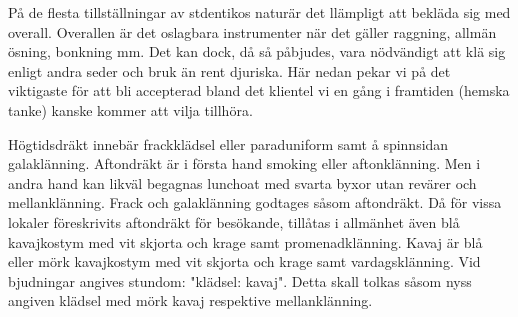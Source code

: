 
\pagestyle{Att Bonka med Shtil}


    På de flesta tillställningar av stdentikos naturär det llämpligt att bekläda sig med overall. Overallen är det oslagbara instrumenter när det gäller raggning, allmän ösning, bonkning  mm. Det kan dock, då så påbjudes, vara nödvändigt att klä sig enligt andra seder och bruk än rent djuriska. Här nedan pekar vi på det viktigaste för att bli accepterad bland det klientel vi en gång i framtiden (hemska tanke) kanske kommer att vilja tillhöra.

    Högtidsdräkt innebär frackklädsel eller paraduniform samt å spinnsidan galaklänning. Aftondräkt är i första hand smoking eller aftonklänning. Men i andra hand kan likväl begagnas lunchoat med svarta byxor utan revärer och mellanklänning. Frack och galaklänning godtages såsom aftondräkt. Då för vissa lokaler föreskrivits aftondräkt för besökande, tillåtas i allmänhet även blå kavajkostym med vit skjorta och krage samt promenadklänning. Kavaj är blå eller mörk kavajkostym med vit skjorta och krage samt vardagsklänning. Vid bjudningar angives stundom: "klädsel: kavaj". Detta skall tolkas såsom nyss angiven klädsel med mörk kavaj respektive mellanklänning.

